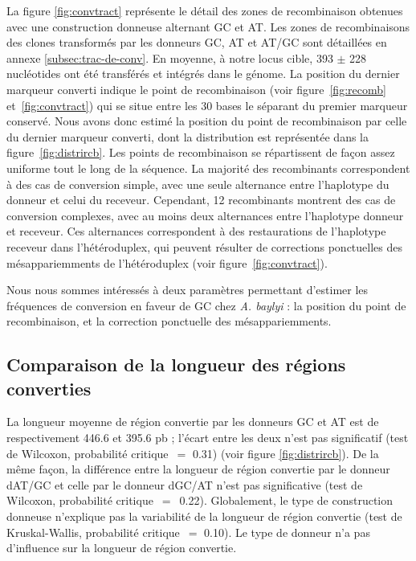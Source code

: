 La figure \ref{fig:convtract} représente le détail des zones de recombinaison
obtenues avec une construction donneuse alternant GC et AT. Les zones de
recombinaisons des clones transformés par les donneurs GC, AT et AT/GC sont
détaillées en annexe \ref{subsec:trac-de-conv}. En moyenne, à notre locus cible,
\num{393} \(\pm\) \num{228} nucléotides ont été transférés et intégrés dans le
génome. La position du dernier marqueur converti indique le point de
recombinaison (voir figure~\ref{fig:recomb} et~\ref{fig:convtract}) qui se situe
entre les 30 bases le séparant du premier marqueur conservé. Nous avons donc
estimé la position du point de recombinaison par celle du dernier marqueur
converti, dont la distribution est représentée dans la
figure~\ref{fig:distrircb}. Les points de recombinaison se répartissent de façon
assez uniforme tout le long de la séquence. La majorité des recombinants
correspondent à des cas de conversion simple, avec une seule alternance entre
l'haplotype du donneur et celui du receveur. Cependant, \num{12} recombinants
montrent des cas de conversion complexes, avec au moins deux alternances entre
l'haplotype donneur et receveur. Ces alternances correspondent à des
restaurations de l'haplotype receveur dans l'hétéroduplex, qui peuvent résulter
de corrections ponctuelles des mésappariemments de l'hétéroduplex (voir
figure~\ref{fig:convtract}).

Nous nous sommes intéressés à deux paramètres permettant d'estimer les
fréquences de conversion en faveur de GC chez \emph{A. baylyi} : la position du
point de recombinaison, et la correction ponctuelle des mésappariemments.


\subsection{Comparaison de la longueur des régions converties}
\label{subsec:longueur}

La longueur moyenne de région convertie par les donneurs GC et AT est de
respectivement \num{446.6} et \num{395.6} pb ; l'écart entre les deux n'est pas
significatif (test de Wilcoxon, probabilité critique~\(=\) \num{0.31}) (voir
figure \ref{fig:distrircb}). De la même façon, la différence entre la longueur
de région convertie par le donneur dAT/GC et celle par le donneur dGC/AT n'est
pas significative (test de Wilcoxon, probabilité critique~\(=\)~\num{0.22}).
Globalement, le type de construction donneuse n'explique pas la variabilité de
la longueur de région convertie (test de Kruskal-Wallis, probabilité
critique~\(=\) \num{0.10}). Le type de donneur n'a pas d'influence sur la
longueur de région convertie.

